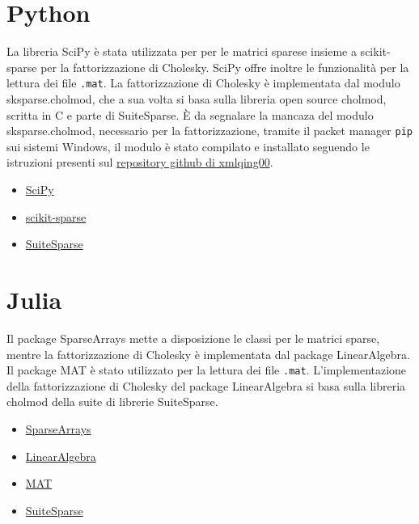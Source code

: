 \documentclass{report}
\begin{document}
        \section{Python}
            La libreria SciPy è stata utilizzata per per le matrici sparese insieme a scikit-sparse per la 
            fattorizzazione di Cholesky.
            SciPy offre inoltre le funzionalità per la lettura dei file \texttt{.mat}.
            La fattorizzazione di Cholesky è implementata dal modulo sksparse.cholmod, che a sua volta si basa sulla
            libreria open source cholmod, scritta in C e parte di SuiteSparse.
            \`E da segnalare la mancaza del modulo sksparse.cholmod, necessario per la fattorizzazione, tramite il 
            packet manager \texttt{pip} sui sistemi Windows, il modulo è stato compilato e installato seguendo le
            istruzioni presenti sul 
            \href{https://github.com/xmlyqing00/Cholmod-Scikit-Sparse-Windows}{repository github di xmlqing00}.

            \begin{itemize}
                \item \href{https://www.scipy.org/}{SciPy}
                \item \href{https://github.com/scikit-sparse/scikit-sparse} {scikit-sparse}
                \item \href{http://suitesparse.com}{SuiteSparse}
            \end{itemize}

        \section{Julia}
            Il package SparseArrays mette a disposizione le classi per le matrici sparse, mentre la fattorizzazione di 
            Cholesky
            è implementata dal package LinearAlgebra.
            Il package MAT è stato utilizzato per la lettura dei file \texttt{.mat}.
            L'implementazione della fattorizzazione di Cholesky del package LinearAlgebra si basa sulla libreria cholmod
            della suite di librerie SuiteSparse.

            \begin{itemize}
                \item \href{https://docs.julialang.org/en/v1/stdlib/SparseArrays/}{SparseArrays}
                \item \href{https://docs.julialang.org/en/v1/stdlib/LinearAlgebra/}{LinearAlgebra}
                \item \href{https://github.com/JuliaIO/MAT.jl}{MAT}
                \item \href{http://suitesparse.com}{SuiteSparse}
            \end{itemize}
\end{document}
